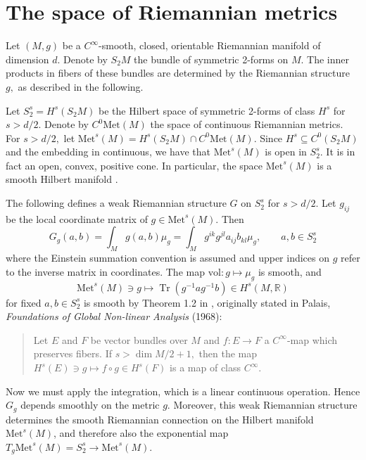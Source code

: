 \documentclass[a5paper,10pt,twoside]{article}
\newcommand{\Met}{\ensuremath{\mathrm{Met}}}
\DeclareMathOperator*{\Tr}{Tr}
\theoremstyle{plain}
\theoremstyle{definition}
\theoremstyle{remark}
\begin{document}
\section{The space of Riemannian metrics}
Let $(M,g)$ be a $C^\infty$-smooth, closed, orientable Riemannian manifold of dimension $d.$ Denote by  $S_2M$ the bundle of symmetric 2-forms on $M$. The inner products in fibers of these bundles are determined by the Riemannian structure $g,$ as described in the following.

Let $S_2^s=H^s(S_2M)$ be the Hilbert space of symmetric 2-forms of class $H^s$ for $s>d/2$. Denote by $C^0\Met(M)$ the space of continuous Riemannian metrics. For $s>d/2,$ let $\Met^s(M)=H^s(S_2M)\cap C^0\Met(M)$. Since $H^s\subseteq C^0(S_2M)$ and the embedding in continuous, we have that $\Met^s(M)$ is open in $S_2^s$. It is in fact an open, convex, positive cone. In particular, the space $\Met^s(M)$ is a smooth Hilbert manifold \cite{smolentsev2007spaces}.

The following defines a weak Riemannian structure $G$ on $S_2^s$ for $s>d/2$. Let $g_{ij}$ be the local coordinate matrix of $g\in\Met^s(M).$ Then
%
\begin{equation}
\label{Met-metric}
G_g(a,b)=\int_Mg(a,b)\mu_g=\int_M g^{ik}g^{jl}a_{ij}b_{kl} \mu_g,\qquad a,b\in S_2^s
\end{equation}
%
where the Einstein summation convention is assumed and upper indices on $g$ refer to the inverse matrix in coordinates. The map $\mathrm{vol}:g\mapsto\mu_g$ is smooth, and 
%
\begin{equation}
\Met^s(M)\ni g\mapsto \Tr(g^{-1}ag^{-1}b)\in H^s(M,\mathbb{R})
\end{equation}
%
for fixed $a,b\in S_2^s$ is smooth by Theorem 1.2 in \cite{smolentsev2007spaces}, originally stated in Palais, \textit{Foundations of Global Non-linear Analysis} (1968):

\begin{quote}
	Let $E$ and $F$ be vector bundles over $M$ and $f:E\to F$ a $C^\infty$-map which preserves fibers. If $s>\dim M/2+1,$ then the map $H^s(E)\ni g\mapsto f\circ g\in H^s(F)$ is a map of class $C^\infty.$
\end{quote}



Now we must
apply the integration, which is a linear continuous operation. Hence $G_g$ depends smoothly on the metric $g$. Moreover, this weak Riemannian structure determines the smooth Riemannian connection
on the Hilbert manifold $\Met^s(M)$, and therefore also the exponential map $T_g\Met^s(M)=S_2^s\to\Met^s(M)$.
	
\end{document}
